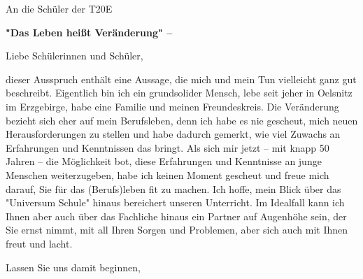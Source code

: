 \documentclass[12pt,a4paper]{letter}
\begin{document}
\begin{letter}{An die Schüler der T20E}
\begin{flushleft}
\textbf{"Das Leben heißt Veränderung" –}\\
\end{flushleft}
\opening{Liebe Schülerinnen und Schüler,}
dieser Ausspruch enthält eine Aussage, die mich und mein Tun vielleicht ganz gut beschreibt.
Eigentlich bin ich ein grundsolider Mensch, lebe seit jeher in Oelsnitz im Erzgebirge, habe eine Familie und meinen Freundeskreis.
Die Veränderung bezieht sich eher auf mein Berufsleben, denn ich habe es nie gescheut, mich neuen Herausforderungen zu stellen und habe dadurch gemerkt, wie viel Zuwachs an Erfahrungen und Kenntnissen das bringt.
Als sich mir jetzt – mit knapp 50 Jahren – die Möglichkeit bot, diese Erfahrungen und Kenntnisse an junge Menschen weiterzugeben, habe ich keinen Moment gescheut und freue mich darauf, Sie für das (Berufs)leben fit zu machen. Ich hoffe, mein Blick über das "Universum Schule" hinaus bereichert unseren Unterricht.
Im Idealfall kann ich Ihnen aber auch über das Fachliche hinaus ein Partner auf Augenhöhe sein, der Sie ernst nimmt, mit all Ihren Sorgen und Problemen, aber sich auch mit Ihnen freut und lacht.
\closing{Lassen Sie uns damit beginnen,} 
\end{letter} 
\end{document}
